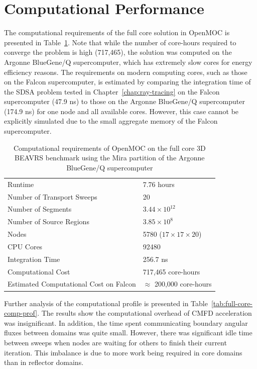\section{Computational Performance}
\label{sec:fc-computational-performance}

The computational requirements of the full core solution in OpenMOC is presented in Table~\ref{tab:full-core-comp-req}. Note that while the number of core-hours required to converge the problem is high (717,465), the solution was computed on the Argonne BlueGene/Q supercomputer, which has extremely slow cores for energy efficiency reasons. The requirements on modern computing cores, such as those on the Falcon supercomputer, is estimated by comparing the integration time of the SDSA problem tested in Chapter~\ref{chap:ray-tracing} on the Falcon supercomputer (47.9 ns) to those on the Argonne BlueGene/Q supercomputer (174.9 ns) for one node and all available cores. However, this case cannot be explicitly simulated due to the small aggregate memory of the Falcon supercomputer.

\begin{table}[ht]
	\centering
	\caption{Computational requirements of OpenMOC on the full core 3D BEAVRS benchmark using the Mira partition of the Argonne BlueGene/Q supercomputer}
	\medskip
	\begin{tabular}{l|l}
		\hline
		Runtime & 7.76 hours \\
		Number of Transport Sweeps & 20 \\
		Number of Segments & $3.44 \times 10^{12}$ \\
		Number of Source Regions & $3.85 \times 10^8$\\
		Nodes & 5780 ($17 \times 17 \times 20$) \\
		CPU Cores & 92480 \\
		Integration Time & 256.7 ns \\
		Computational Cost & 717,465 core-hours \\
		Estimated Computational Cost on Falcon & $\approx$ 200,000 core-hours \\
		\hline
	\end{tabular}
	\label{tab:full-core-comp-req}
\end{table}

Further analysis of the computational profile is presented in Table~\ref{tab:full-core-comp-prof}. The results show the computational overhead of CMFD acceleration was insignificant. In addition, the time spent communicating boundary angular fluxes between domains was quite small. However, there was significant idle time between sweeps when nodes are waiting for others to finish their current iteration. This imbalance is due to more work being required in core domains than in reflector domains.

